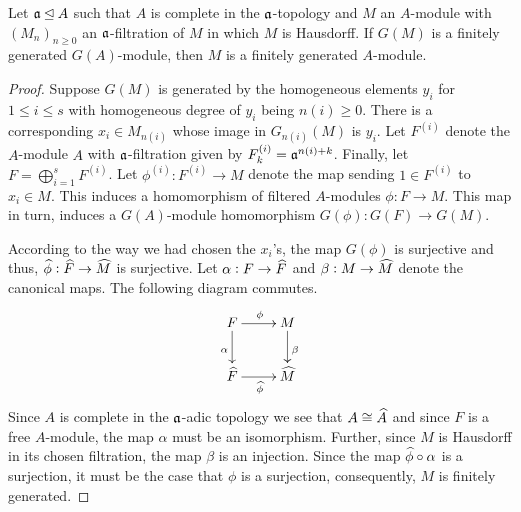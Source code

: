 \begin{lemma}
    Let $\mathfrak a\unlhd A$ such that $A$ is complete in the $\mathfrak a$-topology and $M$ an $A$-module with $(M_n)_{n\ge 0}$ an $\mathfrak a$-filtration of $M$ in which $M$ is Hausdorff. If $G(M)$ is a finitely generated $G(A)$-module, then $M$ is a finitely generated $A$-module.
\end{lemma}
\begin{proof}
    Suppose $G(M)$ is generated by the homogeneous elements $y_i$ for $1\le i\le s$ with homogeneous degree of $y_i$ being $n(i)\ge 0$. There is a corresponding $x_i\in M_{n(i)}$ whose image in $G_{n(i)}(M)$ is $y_i$. Let $F^{(i)}$ denote the $A$-module $A$ with $\mathfrak a$-filtration given by $F^{(i)}_k = \mathfrak a^{n(i) + k}$. Finally, let $F = \bigoplus_{i = 1}^s F^{(i)}$. Let $\phi^{(i)}: F^{(i)}\to M$ denote the map sending $1\in F^{(i)}$ to $x_i\in M$. This induces a homomorphism of filtered $A$-modules $\phi: F\to M$. This map in turn, induces a $G(A)$-module homomorphism $G(\phi): G(F)\to G(M)$.

    According to the way we had chosen the $x_i$'s, the map $G(\phi)$ is surjective and thus, $\widehat{\phi}:\widehat{F}\to\widehat{M}$ is surjective. Let $\alpha: F\to\widehat{F}$ and $\beta: M\to\widehat{M}$ denote the canonical maps. The following diagram commutes.
    \begin{equation*}
        \xymatrix {
            F\ar[r]^{\phi}\ar[d]_\alpha & M\ar[d]^\beta\\
            \wh F\ar[r]_{\wh\phi} & \wh M
        }
    \end{equation*}
    Since $A$ is complete in the $\mathfrak a$-adic topology we see that $A\cong\widehat{A}$ and since $F$ is a free $A$-module, the map $\alpha$ must be an isomorphism. Further, since $M$ is Hausdorff in its chosen filtration, the map $\beta$ is an injection. Since the map $\widehat{\phi}\circ\alpha$ is a surjection, it must be the case that $\phi$ is a surjection, consequently, $M$ is finitely generated.
\end{proof}

